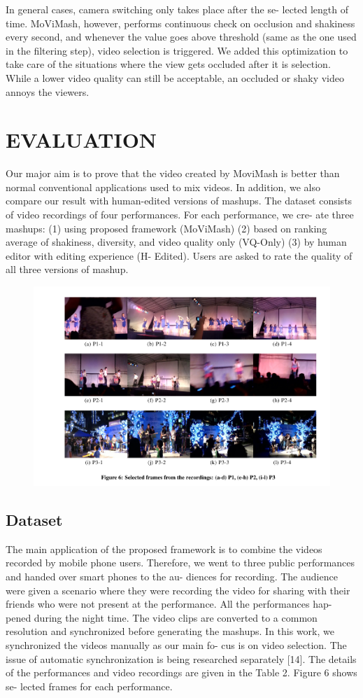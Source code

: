 \documentclass{sig-alternate}
\begin{document}
In general cases, camera switching only takes place after the se-
lected length of time. MoViMash, however, performs continuous
check on occlusion and shakiness every second, and whenever the
value goes above threshold (same as the one used in the filtering
step), video selection is triggered. We added this optimization to
take care of the situations where the view gets occluded after it is
selection. While a lower video quality can still be acceptable, an
occluded or shaky video annoys the viewers.

\section{EVALUATION}
Our major aim is to prove that the video created by MoviMash is better than normal conventional applications used to mix videos. In addition, we also compare our result with human-edited versions of mashups. The dataset consists of video
recordings of four performances. For each performance, we cre-
ate three mashups: (1) using proposed framework (MoViMash) (2)
based on ranking average of shakiness, diversity, and video quality
only (VQ-Only) (3) by human editor with editing experience (H-
Edited). Users are asked to rate the quality of all three versions of
mashup.

\begin{figure}{
\centering
\includegraphics{image6.pdf}}
\end{figure}

\subsection{Dataset}
The main application of the proposed framework is to combine
the videos recorded by mobile phone users. Therefore, we went to
three public performances and handed over smart phones to the au-
diences for recording. The audience were given a scenario where
they were recording the video for sharing with their friends who
were not present at the performance. All the performances hap-
pened during the night time. The video clips are converted to a
common resolution and synchronized before generating the mashups.
In this work, we synchronized the videos manually as our main fo-
cus is on video selection. The issue of automatic synchronization is
being researched separately [14]. The details of the performances
and video recordings are given in the Table 2. Figure 6 shows se-
lected frames for each performance.
\end{document}
